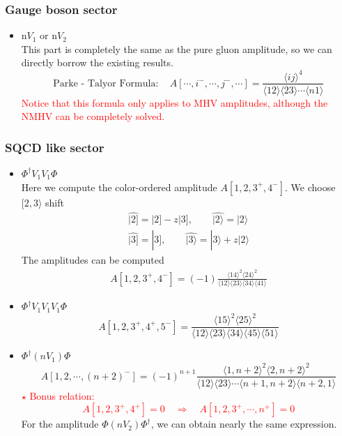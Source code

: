 \documentclass{beamer}
\newcommand{\aket}[1]{|#1\rangle}
\newcommand{\sket}[1]{|#1]}
\newcommand{\avg}[1]{\langle #1 \rangle}
\newcommand{\mdavg}[2]{\langle #1 \rangle\!\langle #2 \rangle}
\begin{document}
\begin{frame}
    \frametitle{Gauge boson sector}
    \begin{itemize}
        \item n$ V_1$ or n$V_2$\\
        This part is completely the same as the pure gluon amplitude, so we can directly borrow the
        existing results.
        \begin{equation*}
            \boxed{\text{Parke - Talyor Formula}:\quad A[\cdots,i^-,\cdots,j^-,\cdots]=\frac{\avg{ij}^4}{\avg{12}\!\avg{23}\cdots\avg{n1}}}
        \end{equation*}
        \textcolor{red}{Notice that this formula only applies to MHV amplitudes, although the NMHV can be completely solved.}
    \end{itemize}
\end{frame}

\begin{frame}
    \frametitle{SQCD like sector}
    \begin{itemize}
        \item $\Phi^\dagger V_1V_1\Phi$\\
        Here we compute the color-ordered amplitude $A[1,2,3^+,4^-]$. We choose $[2,3\rangle$ shift
        \begin{gather*}
        \hat{\sket{2}}=\sket{2}-z\sket{3},\qquad \hat{\aket{2}}=\aket{2} \\
        \hat{\sket{3}}=\sket{3},\qquad \hat{\aket{3}}=\aket{3}+z\aket{2}
        \end{gather*}
        The amplitudes can be computed 
        \begin{align*}
            A[1,2,3^+,4^-]=(-1)\frac{\avg{14}^2\avg{24}^2}{\mdavg{12}{23}\!\mdavg{34}{41}}
        \end{align*}
        \item $\Phi^\dagger V_1V_1V_1\Phi$
            \begin{equation*}
                A[1,2,3^+,4^+,5^-]=\frac{\avg{15}^2\!\avg{25}^2}{\mdavg{12}{23}\!\mdavg{34}{45}\!\avg{51}}
            \end{equation*}
    \end{itemize}
\end{frame}

\begin{frame}
    \begin{itemize}
        \item $\Phi^\dagger (nV_1)\Phi$
            \begin{equation*}
                A[1,2,\cdots,(n+2)^-]=(-1)^{n+1}\frac{\avg{1,n+2}^2\avg{2,n+2}^2}{\mdavg{12}{23}\cdots\mdavg{n+1,n+2}{n+2,1}}
            \end{equation*}
            \textcolor{red}{$\star$ Bonus relation: \begin{equation*}
                A[1,2,3^+,4^+]=0\quad \Rightarrow  \quad A[1,2,3^+,\cdots,n^+]=0 \end{equation*}}
        For the amplitude $\Phi (nV_2)\Phi^\dagger$, we can obtain nearly the same expression.
    \end{itemize}
\end{frame}
\end{document}
